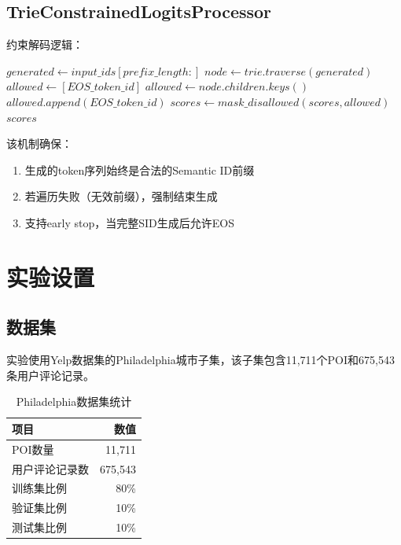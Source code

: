 \subsection{TrieConstrainedLogitsProcessor}
\label{sec:trie_processor}

约束解码逻辑：

\begin{algorithm}[htbp]
\caption{Trie约束解码算法}
\label{alg:trie_decode}
\begin{algorithmic}[1]
 
    \State $generated \gets input\_ids[prefix\_length:]$ 
    \State $node \gets trie.traverse(generated)$
        \State $allowed \gets [EOS\_token\_id]$ 
    \Else
        \State $allowed \gets node.children.keys()$ 
            \State $allowed.append(EOS\_token\_id)$
        \EndIf
    \EndIf
    \State $scores \gets mask\_disallowed(scores, allowed)$ 
\EndFor
\State \Return $scores$
\end{algorithmic}
\end{algorithm}

该机制确保：
\begin{enumerate}
    \item 生成的token序列始终是合法的Semantic ID前缀
    \item 若遍历失败（无效前缀），强制结束生成
    \item 支持early stop，当完整SID生成后允许EOS
\end{enumerate}

\section{实验设置}
\label{sec:experiment_setup}

\subsection{数据集}
\label{sec:dataset}

实验使用Yelp数据集的Philadelphia城市子集，该子集包含11,711个POI和675,543条用户评论记录。

\begin{table}[htbp]
\centering
\caption{Philadelphia数据集统计}
\label{tab:dataset_stats}
\begin{tabular}{lr}
\toprule
项目 & 数值 \\
\midrule
POI数量 & 11,711 \\
用户评论记录数 & 675,543 \\
\midrule
训练集比例 & 80\% \\
验证集比例 & 10\% \\
测试集比例 & 10\% \\
\bottomrule
\end{tabular}
\end{table}

